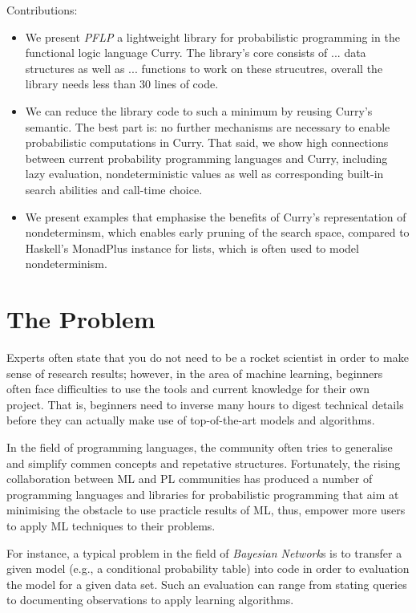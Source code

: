 \documentclass[
12pt, %
a4paper, %
oneside, %
]{llncs}
\begin{document}
Contributions:
\begin{itemize}
\item We present \emph{PFLP} a lightweight library for probabilistic
  programming in the functional logic language Curry. %
  The library's core consists of ... data structures as well as
  ... functions to work on these strucutres, overall the library needs
  less than 30 lines of code. %
\item We can reduce the library code to such a minimum by reusing Curry's
  semantic. %
  The best part is: no further mechanisms are necessary to enable
  probabilistic computations in Curry. %
  That said, we show high connections between current probability
  programming languages and Curry, including lazy evaluation,
  nondeterministic values as well as corresponding built-in search
  abilities and call-time choice. %
\item We present examples that emphasise the benefits of Curry's
  representation of nondeterminsm, which enables early pruning of the
  search space, compared to Haskell's MonadPlus instance for lists,
  which is often used to model nondeterminism. %
\end{itemize}

\section{The Problem}

Experts often state that you do not need to be a rocket scientist in
order to make sense of research results; however, in the area of
machine learning, beginners often face difficulties to use the tools
and current knowledge for their own project. %
That is, beginners need to inverse many hours to digest technical
details before they can actually make use of top-of-the-art models and
algorithms. %

In the field of programming languages, the community often tries to
generalise and simplify commen concepts and repetative structures. %
Fortunately, the rising collaboration between ML and PL communities
has produced a number of programming languages and libraries for
probabilistic programming that aim at minimising the obstacle to use
practicle results of ML, thus, empower more users to apply ML
techniques to their problems. %


For instance, a typical problem in the field of \emph{Bayesian
  Network}s is to transfer a given model (e.g., a conditional
probability table) into code in order to evaluation the model for a
given data set. %
Such an evaluation can range from stating queries to documenting
observations to apply learning algorithms. %
\end{document}
